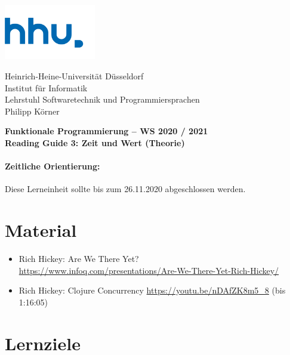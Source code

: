\documentclass[11pt,a4paper]{article}
\theoremstyle{break}
\begin{document}
\begin{minipage}[b]{\textwidth}
\parbox[t]{5cm}{%
\includegraphics[width=4cm]{unilogo}
\hfill
}
\parbox[b]{11cm}{%
Heinrich-Heine-Universit\"at D\"usseldorf\\
Institut f\"ur Informatik\\
Lehrstuhl Softwaretechnik und Programmiersprachen\\
Philipp K\"orner
}

\end{minipage}
\begin{center}
\bf
Funktionale Programmierung -- WS 2020 / 2021\\
Reading Guide 3: Zeit und Wert (Theorie)
\end{center}

\pagestyle{empty}

\paragraph{Zeitliche Orientierung:} Diese Lerneinheit sollte bis zum 26.11.2020 abgeschlossen werden.

\section{Material} 

\begin{itemize}
\item Rich Hickey: Are We There Yet? \\ \url{https://www.infoq.com/presentations/Are-We-There-Yet-Rich-Hickey/}
\item Rich Hickey: Clojure Concurrency \url{https://youtu.be/nDAfZK8m5_8} (bis 1:16:05)
\end{itemize}


\section{Lernziele}
\end{document}
